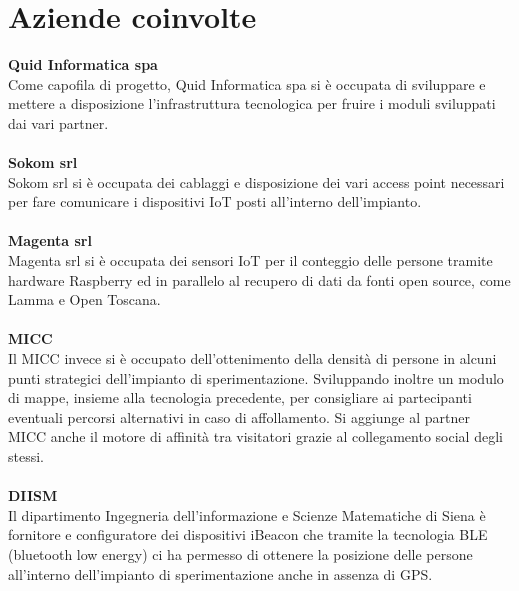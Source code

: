\paragraph{}

\section{Aziende coinvolte}

\textbf{Quid Informatica spa}\\
Come capofila di progetto, Quid Informatica spa si è occupata di sviluppare e mettere a disposizione l’infrastruttura tecnologica per fruire i moduli sviluppati dai vari partner.
\paragraph{}

\textbf{Sokom srl}\\
Sokom srl si è occupata dei cablaggi e disposizione dei vari access point necessari per fare comunicare i dispositivi IoT posti all’interno dell’impianto.
\paragraph{}

\textbf{Magenta srl}\\
Magenta srl si è occupata dei sensori IoT per il conteggio delle persone tramite hardware Raspberry ed in parallelo al recupero di dati da fonti open source, come Lamma e Open Toscana.
\paragraph{}

\textbf{MICC}\\
Il MICC invece si è occupato dell’ottenimento della densità di persone in alcuni punti strategici dell’impianto di sperimentazione. Sviluppando inoltre un modulo di mappe, insieme alla tecnologia precedente, per consigliare ai partecipanti eventuali percorsi alternativi in caso di affollamento.
Si aggiunge al partner MICC anche il motore di affinità tra visitatori grazie al collegamento social degli stessi.
\paragraph{}

\textbf{DIISM}\\
Il dipartimento Ingegneria dell’informazione e Scienze Matematiche di Siena è fornitore e configuratore dei dispositivi iBeacon che tramite la tecnologia BLE (bluetooth low energy) ci ha permesso di ottenere la posizione delle persone all’interno dell’impianto di sperimentazione anche in assenza di GPS.

